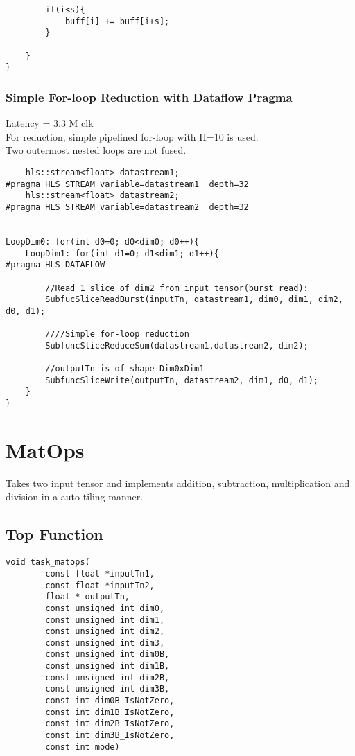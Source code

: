 \documentclass[•]{article}
\begin{document}
\begin{enumerate}
\begin{lstlisting}
		if(i<s){
			buff[i] += buff[i+s];
		}

	}
}
\end{lstlisting}

\subsubsection{Simple For-loop Reduction with Dataflow Pragma}
Latency = 3.3 M clk \\
For reduction, simple pipelined for-loop with II=10 is used.\\
Two outermost nested loops are not fused.
\begin{lstlisting}
    hls::stream<float> datastream1;
#pragma HLS STREAM variable=datastream1  depth=32
    hls::stream<float> datastream2;
#pragma HLS STREAM variable=datastream2  depth=32


LoopDim0: for(int d0=0; d0<dim0; d0++){
	LoopDim1: for(int d1=0; d1<dim1; d1++){
#pragma HLS DATAFLOW

		//Read 1 slice of dim2 from input tensor(burst read):
		SubfucSliceReadBurst(inputTn, datastream1, dim0, dim1, dim2, d0, d1);

		////Simple for-loop reduction
		SubfuncSliceReduceSum(datastream1,datastream2, dim2);

		//outputTn is of shape Dim0xDim1
		SubfuncSliceWrite(outputTn, datastream2, dim1, d0, d1);
	}
}

\end{lstlisting}

\end{enumerate}






\pagebreak






\section{MatOps}
Takes two input tensor and implements addition, subtraction, multiplication and division in a auto-tiling manner.
\subsection{Top Function}
\begin{lstlisting}
void task_matops(
		const float *inputTn1,
		const float *inputTn2,
		float * outputTn,
		const unsigned int dim0,
		const unsigned int dim1,
		const unsigned int dim2,
		const unsigned int dim3,
		const unsigned int dim0B,
		const unsigned int dim1B,
		const unsigned int dim2B,
		const unsigned int dim3B,
		const int dim0B_IsNotZero,
		const int dim1B_IsNotZero,
		const int dim2B_IsNotZero,
		const int dim3B_IsNotZero,
		const int mode)
\end{lstlisting}
\end{document}
